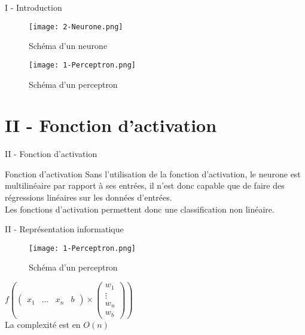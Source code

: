 \documentclass[10pt]{beamer}
\begin{document}
\begin{frame}{I - Introduction}
\begin{figure}
	\centering
    \texttt{[image: 2-Neurone.png]}
	\caption{Schéma d'un neurone}	
\end{figure}
\begin{figure}
	\centering
    \texttt{[image: 1-Perceptron.png]}
	\caption{Schéma d'un perceptron}	
\end{figure}
\end{frame}

\section{II - Fonction d'activation}
\begin{frame}{II - Fonction d'activation}
\begin{block}{Fonction d'activation}
Sans l'utilisation de la fonction d'activation, le neurone est multilinéaire par rapport à ses entrées, il n'est donc capable que de faire des régressions linéaires sur les données d'entrées. \\
Les fonctions d'activation permettent donc une classification non linéaire.
\end{block}
\end{frame}


\begin{frame}{II - Représentation informatique}
\begin{figure}
	\centering
    \texttt{[image: 1-Perceptron.png]}
	\caption{Schéma d'un perceptron}	
\end{figure}
\begin{multicols}{2}
$
f
\left(
\begin{pmatrix}
x_1 & \ldots & x_n & b
\end{pmatrix}
\times
\begin{pmatrix}
w_1 \\
\vdots \\
w_n \\
w_b
\end{pmatrix}
\right)
$ \\
La complexité est en $O(n)$
\columnbreak

\end{multicols}
\end{frame}
\end{document}
